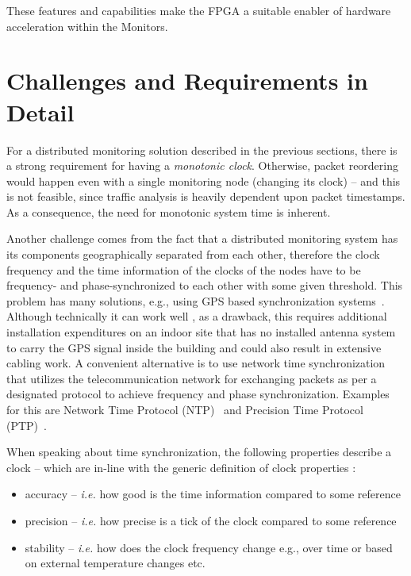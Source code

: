 \documentclass[journal]{IEEEtran}
\begin{document}
These features and capabilities make the FPGA a suitable enabler of hardware acceleration within the Monitors.

\section{Challenges and Requirements in Detail}\label{sec:Challanges}


For a distributed monitoring solution described in the previous sections, there is a strong requirement for having
a \emph{monotonic clock}. Otherwise, packet reordering would happen even with a single monitoring node (changing its clock) -- and this is not feasible, since traffic analysis is heavily dependent upon packet timestamps. As a consequence, the need for monotonic system time is inherent.

Another challenge comes from the fact that a distributed monitoring system has its components geographically
separated from each other, therefore the clock frequency and the time information of the clocks of the nodes have to be
frequency- and phase-synchronized to each other with some given threshold. This problem has many solutions, e.g., using
GPS based synchronization
systems~\cite{GPS-CLOCK}. Although technically it can work well \cite{NetFPGA_GPS}, as a drawback, this requires additional installation expenditures on an indoor site that has no installed
antenna system to carry the GPS signal inside the building and could also result in extensive cabling work. 
A convenient alternative is to use network time synchronization that utilizes the telecommunication network for
exchanging packets as per a designated protocol to achieve frequency and phase synchronization. Examples for this
are Network Time Protocol (NTP)~\cite{NTP_book} and Precision Time Protocol (PTP)~\cite{PTP_standard}.

When speaking about time synchronization, the following properties describe a clock -- which are in-line with the generic definition of clock properties \cite{NTP_IEEEToN}:
\begin{itemize}
    \item accuracy -- \emph{i.e.} how good is the time information compared to some reference
    \item precision -- \emph{i.e.} how precise is a tick of the clock compared to some reference
    \item stability -- \emph{i.e.} how does the clock frequency change	e.g., over time or based on external
          temperature changes etc.
\end{itemize}
\end{document}
